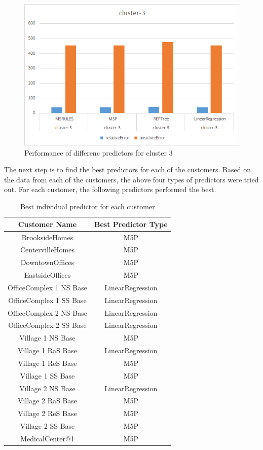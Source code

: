 \begin{figure}[h!]
  \includegraphics[width=\linewidth]{cluster-3-predictors.png}
  \caption{Performance of differenc predictors for cluster 3}
  \label{fig:cluster-3-predictors}
\end{figure}

The next step is to find the best predictors for each of the customers. Based on the data from each of the customers, the above four types of predictors were tried out. For each customer, the following predictors performed the best. 

\begin{table}[h!]
\centering
\begin{tabular}{|c| c|} 
 \hline
 Customer Name & Best Predictor Type \\ [0.5ex] 
 \hline
BrooksideHomes &	M5P \\
CentervilleHomes &	M5P \\
DowntownOffices &	M5P \\
EastsideOffices &	M5P \\
OfficeComplex 1 NS Base &	LinearRegression \\
OfficeComplex 1 SS Base &	LinearRegression \\
OfficeComplex 2 NS Base &	LinearRegression \\
OfficeComplex 2 SS Base &	LinearRegression \\
Village 1 NS Base &	M5P \\
Village 1 RaS Base &	LinearRegression \\
Village 1 ReS Base &	M5P \\
Village 1 SS Base &	M5P \\
Village 2 NS Base &	LinearRegression \\
Village 2 RaS Base &	M5P \\
Village 2 ReS Base &	M5P \\
Village 2 SS Base &	M5P \\
MedicalCenter@1	& M5P \\ [1ex] 
 \hline
\end{tabular}
\caption{Best individual predictor for each customer}
\label{table:1}
\end{table}

